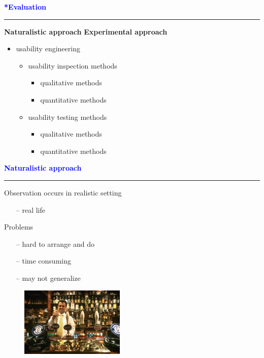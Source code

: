\documentclass[pdf]{beamer}
\begin{document}
{
\begin{frame}
    \textcolor{Blue}{\textbf{\Large{*Evaluation}}}
    \textcolor{red}{\rule{10cm}{1mm}}

\large{\textbf{Naturalistic approach}}
\newline
\newline
\large{\textbf{Experimental approach}}
\begin{itemize}
	\item
		\large{usability engineering}
			\begin{itemize}
				\item usability inspection methods
					\begin{itemize}
						\item qualitative methods
						\item quantitative methods
					\end{itemize}
				\item usability testing methods
					\begin{itemize}
						\item qualitative methods
						\item quantitative methods
					\end{itemize}
			\end{itemize}
	\end{itemize}
\end{frame}



{
\begin{frame}
    \textcolor{Blue}{\textbf{\Large{Naturalistic approach}}}
    \textcolor{red}{\rule{10cm}{1mm}}
    
    Observation occurs in realistic setting\par
    \begin{itemize}
    \item[\textcolor{black}{--}] real life
    \end{itemize}
    	\bigskip
   Problems\par
    \begin{itemize}
    \item[\textcolor{black}{--}] hard to arrange and do
    \item[\textcolor{black}{--}] time consuming
    \item[\textcolor{black}{--}] may not generalize
    \end{itemize}
    \begin{figure}[b]
    	\includegraphics[scale = 0.4, right]{5_img.png}
    \end{figure}    
\end{frame}}



}
\end{document}
